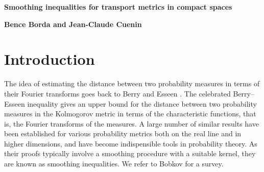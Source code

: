 \documentclass[11pt,a4paper]{article}
\theoremstyle{definition}
\newcommand{\proofnameformat}{}
\begin{document}
\renewcommand{\proofnameformat}{\bfseries}

\begin{center}
{\Large\textbf{Smoothing inequalities for transport metrics in compact spaces}}

\vspace{10mm}

\textbf{Bence Borda and Jean-Claude Cuenin}

\let\thefootnote\relax{}

\let\thefootnote\relax{}
\end{center}

\vspace{10mm}

\begin{abstract}
We prove general upper estimates for the distance between two Borel probability measures in Wasserstein metric in terms of the Fourier transforms of the measures. We work in compact manifolds including the torus, the Euclidean unit sphere, compact Lie groups and compact homogeneous spaces, and treat the Wasserstein metric $W_p$ in the full range $1 \le p \le \infty$ for the first time. The proofs are based on a comparison between the Wasserstein metric and a dual Sobolev norm, Riesz transform estimates and Hausdorff--Young inequalities on compact manifolds. As an application, we show that spherical designs are optimally close to the uniform measure on the sphere in Wasserstein metric.
\end{abstract}

\tableofcontents

\section{Introduction}

The idea of estimating the distance between two probability measures in terms of their Fourier transforms goes back to Berry \cite{BE} and Esseen \cite{ES}. The celebrated Berry--Esseen inequality gives an upper bound for the distance between two probability measures in the Kolmogorov metric in terms of the characteristic functions, that is, the Fourier transforms of the measures. A large number of similar results have been established for various probability metrics both on the real line and in higher dimensions, and have become indispensible tools in probability theory. As their proofs typically involve a smoothing procedure with a suitable kernel, they are known as smoothing inequalities. We refer to Bobkov \cite{BOB} for a survey.
\end{document}
